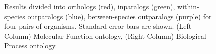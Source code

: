 \begin{figure}
\begin{centering}
\par\end{centering}
\caption[Comparison of orthologs and different subtypes of paralogs in four pairs of organisms]{Results divided into orthologs (red), inparalogs (green), within-species  outparalogs (blue), between-species outparalogs (purple) for four pairs of organisms. Standard error bars are shown. (Left Column) Molecular Function ontology, (Right Column) Biological Process ontology.}
\label{fig:oc2}
\end{figure}
